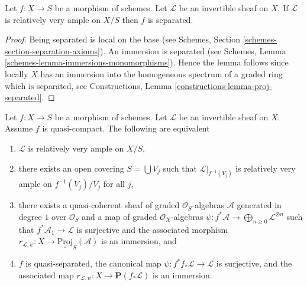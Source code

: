 \begin{lemma}
\label{lemma-relatively-very-ample-separated}
Let $f : X \to S$ be a morphism of schemes.
Let $\mathcal{L}$ be an invertible sheaf on $X$.
If $\mathcal{L}$ is relatively very ample on $X/S$ then
$f$ is separated.
\end{lemma}

\begin{proof}
Being separated is local on the base (see
Schemes, Section \ref{schemes-section-separation-axioms}).
An immersion is separated
(see Schemes, Lemma \ref{schemes-lemma-immersions-monomorphisms}).
Hence the lemma follows since locally $X$ has an immersion into
the homogeneous spectrum of a graded ring which is separated, see
Constructions, Lemma \ref{constructions-lemma-proj-separated}.
\end{proof}

\begin{lemma}
\label{lemma-relatively-very-ample}
Let $f : X \to S$ be a morphism of schemes.
Let $\mathcal{L}$ be an invertible sheaf on $X$.
Assume $f$ is quasi-compact. The following are
equivalent
\begin{enumerate}
\item $\mathcal{L}$ is relatively very ample on $X/S$,
\item there exists an open covering $S = \bigcup V_j$ such
that $\mathcal{L}|_{f^{-1}(V_j)}$ is relatively very ample
on $f^{-1}(V_j)/V_j$ for all $j$,
\item there exists a quasi-coherent sheaf of graded
$\mathcal{O}_S$-algebras $\mathcal{A}$ generated in degree
$1$ over $\mathcal{O}_S$ and a map of graded $\mathcal{O}_X$-algebras
$\psi : f^*\mathcal{A} \to \bigoplus_{n \geq 0} \mathcal{L}^{\otimes n}$
such that $f^*\mathcal{A}_1 \to \mathcal{L}$ is surjective and the
associated morphism
$r_{\mathcal{L}, \psi} : X \to \underline{\text{Proj}}_S(\mathcal{A})$
is an immersion, and
\item $f$ is quasi-separated, the canonical map
$\psi : f^*f_*\mathcal{L} \to \mathcal{L}$ is surjective, and
the associated map $r_{\mathcal{L}, \psi} : X \to \mathbf{P}(f_*\mathcal{L})$
is an immersion.
\end{enumerate}
\end{lemma}

